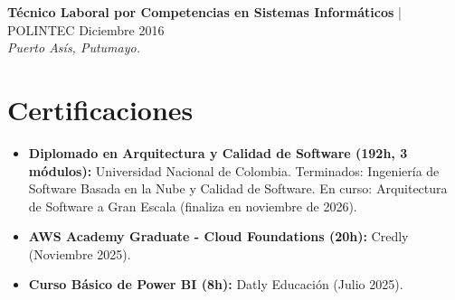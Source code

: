 \documentclass[11pt,a4paper]{article}
\begin{document}
\vspace{0.2cm}

\noindent
\textbf{Técnico Laboral por Competencias en Sistemas Informáticos} | POLINTEC \hfill Diciembre 2016 \\
\textit{Puerto Asís, Putumayo.}

\section*{Certificaciones}
\begin{itemize}[leftmargin=*, noitemsep]
    \item \textbf{Diplomado en Arquitectura y Calidad de Software (192h, 3 módulos):} Universidad Nacional de Colombia. Terminados: Ingeniería de Software Basada en la Nube y Calidad de Software. En curso: Arquitectura de Software a Gran Escala (finaliza en noviembre de 2026).
    \item \textbf{AWS Academy Graduate - Cloud Foundations (20h):} Credly (Noviembre 2025).
    \item \textbf{Curso Básico de Power BI (8h):} Datly Educación (Julio 2025).
\end{itemize}
\end{document}
